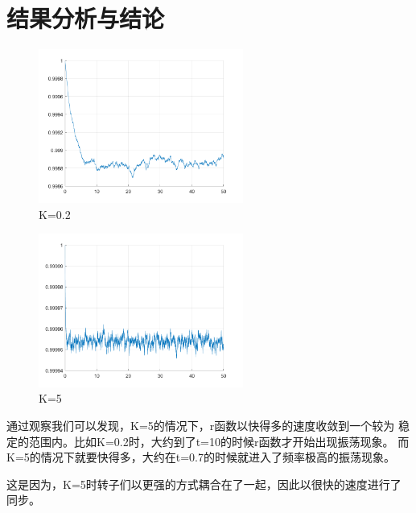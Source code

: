 \documentclass[UTF8,a4paper,10pt]{ctexart}
\begin{document}
\section{结果分析与结论}
\quad \newline
	\begin{figure}[!htbp]
		\centering
		\includegraphics[width=0.6\textwidth,height=0.4\textwidth]{pictures/02.png}
		\caption{K=0.2} \label{02}
	\end{figure}
\quad \newline
	\begin{figure}[!htbp]
		\centering
		\includegraphics[width=0.6\textwidth,height=0.4\textwidth]{pictures/5.png}
		\caption{K=5} \label{5}
	\end{figure}

  通过观察我们可以发现，K=5的情况下，r函数以快得多的速度收敛到一个较为
  稳定的范围内。比如K=0.2时，大约到了t=10的时候r函数才开始出现振荡现象。
  而K=5的情况下就要快得多，大约在t=0.7的时候就进入了频率极高的振荡现象。\newline

  这是因为，K=5时转子们以更强的方式耦合在了一起，因此以很快的速度进行了同步。


\end{document}
